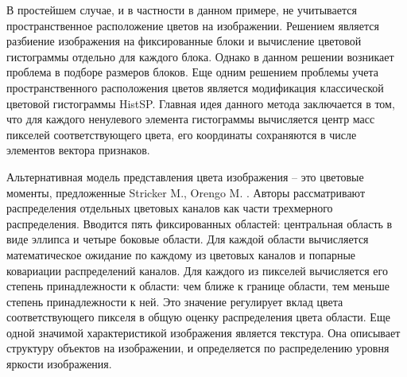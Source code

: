 В простейшем случае, и в частности в данном примере, не учитывается
пространственное расположение цветов на изображении. Решением является разбиение
изображения на фиксированные блоки и вычисление цветовой гистограммы отдельно для
каждого блока. Однако в данном решении возникает проблема в подборе размеров блоков.
Еще одним решением проблемы учета пространственного расположения цветов является
модификация классической цветовой гистограммы HistSP. Главная идея данного
метода заключается в том, что для каждого ненулевого элемента гистограммы 
вычисляется центр масс пикселей соответствующего цвета, его координаты сохраняются в
числе элементов вектора признаков.


Альтернативная модель представления цвета изображения – это цветовые
моменты, предложенные Stricker M., Orengo M. \cite{stricker1997spectral}. Авторы рассматривают
распределения отдельных цветовых каналов как части трехмерного распределения.
Вводится пять фиксированных областей: центральная область в виде эллипса и четыре
боковые области. Для каждой области вычисляется математическое ожидание
по каждому из цветовых каналов и попарные ковариации распределений каналов. Для
каждого из пикселей вычисляется его степень принадлежности к области: чем ближе к
границе области, тем меньше степень принадлежности к ней. Это значение регулирует
вклад цвета соответствующего пикселя в общую оценку распределения цвета области.
Еще одной значимой характеристикой изображения является текстура. Она
описывает структуру объектов на изображении, и определяется по распределению уровня
яркости изображения.

